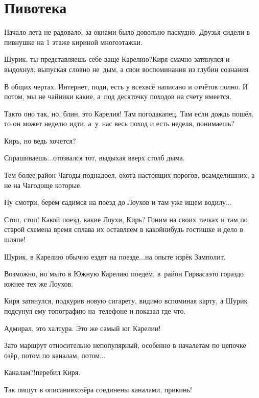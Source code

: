 \chapter{Пивотека}
\vepsianrose

Начало лета не радовало, за окнами было довольно паскудно. Друзья сидели в пивнушке на 1 этаже кириной многоэтажки.

\diagdash Шурик, ты представляешь себе ваще Карелию?\mdash Киря смачно затянулся и выдохнул, выпуская словно не~дым, а свои воспоминания из глубин сознания.

\diagdash В общих чертах. Интернет, поди, есть у всех\mdash всё написано и отчётов полно. И потом, мы не чайники какие, а~под десяточку походов на счету имеется. %

\diagdash Так\sdash то оно так, но, блин, это Карелия! Там погода\mdash капец. Там если дождь пошёл, то он может неделю идти, а~у~нас весь поход и есть неделя, понимаешь?

\diagdash Кирь, но ведь хочется?

\diagdash Спрашиваешь$\ldots$\mdash отозвался тот, выдыхая вверх столб дыма.

\diagdash Тем более район Чагоды поднадоел, охота настоящих порогов, всамделишних, а не на Чагодоще которые.

\diagdash Ну смотри, берём садимся на поезд до Лоухов и там уже ищем водилу$\ldots$

\diagdash Стоп, стоп! Какой поезд, какие Лоухи, Кирь? Гоним на своих тачках и там по старой схеме\mdash на время сплава их оставляем в какой\sdash нибудь гостишке и дело в шляпе!

\diagdash Шурик, в Карелию обычно ездят на поезде$\ldots$\mdash на опыте изрёк Замполит.

\diagdash Возможно, но мы\sdash то в Южную Карелию поедем, в~район Гирваса\mdash это гораздо южнее тех же Лоухов.

Киря затянулся, подкурив новую сигарету, видимо вспоминая карту, а Шурик подсунул ему топографию на~телефоне и показал где что.

\diagdash Адмирал, это халтура. Это же самый юг Карелии!

\diagdash Зато маршрут относительно непопулярный, особенно в начале\mdash там по цепочке озёр, потом по каналам, потом$\ldots$

\diagdash Каналам?!\mdash перебил Киря.

\diagdash Так пишут в описаниях\mdash озёра соединены каналами, прикинь!

